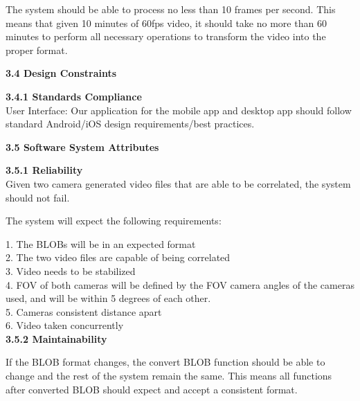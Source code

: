 \documentclass[10pt,draftclsnofoot,onecolumn]{IEEEtran}
\begin{document}
The system should be able to process no less than 10 frames per second. This means that given 10 minutes of 60fps video, it should take no more than 60 minutes to perform all necessary operations to transform the video into the proper format.
  \\\vspace{5mm}

 {\Medium\textbf{3.4 Design Constraints}} \\
   \vspace{5mm}

 {\Medium\textbf{3.4.1 Standards Compliance}} \\
   \vspace{5mm}
   User Interface: Our application for the mobile app and desktop app should follow standard Android/iOS design requirements/best practices.
   \vspace{5mm}

 {\Medium\textbf{3.5 Software System Attributes}} \\
    \vspace{5mm}

 {\Medium\textbf{3.5.1 Reliability}} \\
Given two camera generated video files that are able to be correlated, the system should not fail.\\
 \vspace{2mm}

The system will expect the following requirements:\\
\vspace{2mm}

1. The BLOBs will be in an expected format\\
2. The two video files are capable of being correlated\\
3. Video needs to be stabilized\\
4. FOV of both cameras will be defined by the FOV camera angles of the cameras used, and will be within 5 degrees of each other. \\
5. Cameras consistent distance apart\\
6. Video taken concurrently\\

    \vspace{5mm}
 {\Medium\textbf{3.5.2 Maintainability}} \\
     \vspace{5mm}

If the BLOB format changes, the convert BLOB function should be able to change and the rest of the system remain the same. This means all functions after converted BLOB should expect and accept a consistent format.\\
    \vspace{5mm}
\end{document}
